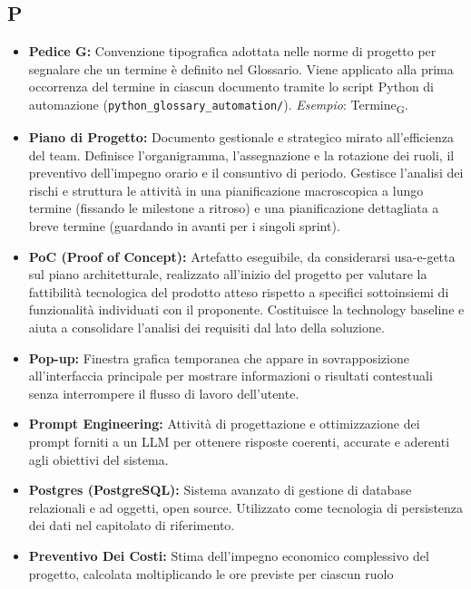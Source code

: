 \subsection*{P}
\begin{itemize}[leftmargin=*]
    \item \textbf{Pedice G:} Convenzione tipografica adottata nelle norme di progetto
          per segnalare che un termine è definito nel Glossario. Viene applicato
          alla prima occorrenza del termine in ciascun documento tramite lo script
          Python di automazione (\texttt{python\_glossary\_automation/}).
          \textit{Esempio}: Termine\textsubscript{G}.
      \item \textbf{Piano di Progetto:} Documento gestionale e strategico mirato all'efficienza del team. Definisce l'organigramma, l'assegnazione e la rotazione dei ruoli, il preventivo dell'impegno orario e il consuntivo di periodo. Gestisce l'analisi dei rischi e struttura le attività in una pianificazione macroscopica a lungo termine (fissando le milestone a ritroso) e una pianificazione dettagliata a breve termine (guardando in avanti per i singoli sprint).
    \item \textbf{PoC (Proof of Concept):} Artefatto eseguibile, da considerarsi
          usa-e-getta sul piano architetturale, realizzato all'inizio del progetto
          per valutare la fattibilità tecnologica del prodotto atteso rispetto a
          specifici sottoinsiemi di funzionalità individuati con il proponente.
          Costituisce la technology baseline e aiuta a consolidare l'analisi dei
          requisiti dal lato della soluzione.
      \item \textbf{Pop-up:} Finestra grafica temporanea che appare in sovrapposizione all'interfaccia principale per mostrare informazioni o risultati contestuali senza interrompere il flusso di lavoro dell'utente.
      \item \textbf{Prompt Engineering:} Attività di progettazione e ottimizzazione dei prompt forniti a un LLM per ottenere risposte coerenti, accurate e aderenti agli obiettivi del sistema.
          \item \textbf{Postgres (PostgreSQL):} Sistema avanzato di gestione di database
          relazionali e ad oggetti, open source. Utilizzato come tecnologia di
          persistenza dei dati nel capitolato di riferimento.
    \item \textbf{Preventivo Dei Costi:} Stima dell'impegno economico complessivo
          del progetto, calcolata moltiplicando le ore previste per ciascun ruolo

\end{itemize}
